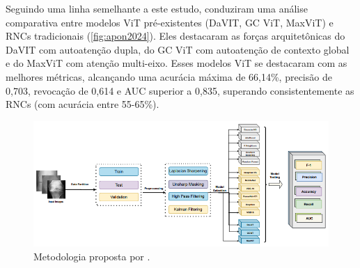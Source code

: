 Seguindo uma linha semelhante a este estudo, \cite{apon2024} conduziram uma análise comparativa entre modelos ViT pré-existentes (DaVIT, GC ViT, MaxViT) e RNCs tradicionais (\autoref{fig:apon2024}). Eles destacaram as forças arquitetônicas do DaVIT com autoatenção dupla, do GC ViT com autoatenção de contexto global e do MaxViT com atenção multi-eixo. Esses modelos ViT se destacaram com as melhores métricas, alcançando uma acurácia máxima de 66,14\%, precisão de 0,703, revocação de 0,614 e AUC superior a 0,835, superando consistentemente as RNCs (com acurácia entre 55-65\%).

\begin{figure}[ht]
    \centering
    \includegraphics[width=\textwidth]{figs/apon2024.png}
    \caption{Metodologia proposta por \cite{apon2024}.}
    \label{fig:apon2024}
\end{figure}